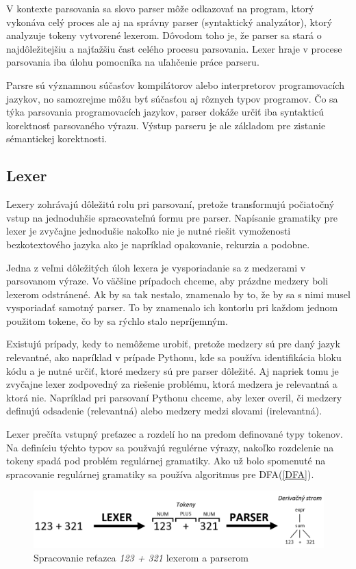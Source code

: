 V kontexte parsovania sa slovo parser môže odkazovať na program, ktorý vykonáva celý proces ale aj na správny parser (syntaktický analyzátor), ktorý analyzuje tokeny vytvorené lexerom. Dôvodom toho je, že parser sa stará o najdôležitejšiu a najťažšiu čast celého procesu parsovania. Lexer hraje v procese parsovania iba úlohu pomocníka na uľahčenie práce parseru.

Parsre sú významnou súčasťov kompilátorov alebo interpretorov programovacích jazykov, no samozrejme môžu byť súčasťou aj rôznych typov programov. Čo sa týka parsovania programovacích jazykov, parser dokáže určiť iba syntakticú korektnosť parsovaného výrazu. Výstup parseru je ale základom pre zistanie sémantickej korektnosti.

\subsection{Lexer}\label{lexer}
Lexery zohrávajú dôležitú  rolu pri parsovaní, pretože transformujú počiatočný vstup na jednoduhšie spracovateľnú formu pre parser. Napísanie gramatiky pre lexer je zvyčajne jednodušie nakoľko nie je nutné riešit vymoženosti bezkotextového jazyka ako je napríklad opakovanie, rekurzia a podobne.

Jedna z veľmi dôležitých úloh lexera je vysporiadanie sa z medzerami v parsovanom výraze. Vo väčšine prípadoch chceme, aby prázdne medzery boli lexerom odstránené. Ak by sa tak nestalo, znamenalo by to, že by sa s nimi musel vysporiadať samotný parser. To by znamenalo ich kontorlu pri každom jednom použitom tokene, čo by sa rýchlo stalo nepríjemným.

Existujú prípady, kedy to nemôžeme urobiť, pretože medzery sú pre daný jazyk relevantné, ako napríklad v prípade Pythonu, kde sa používa identifikácia bloku kódu a je nutné určiť, ktoré medzery sú pre parser dôležité. Aj napriek tomu je zvyčajne lexer zodpovedný za riešenie problému, ktorá medzera je relevantná a ktorá nie. Napríklad pri parsovaní Pythonu chceme, aby lexer overil, či medzery definujú odsadenie (relevantná) alebo medzery medzi slovami (irelevantná). \cite{tomassetti:parsing}

Lexer prečíta vstupný preťazec a rozdelí ho na predom definované typy tokenov. Na definíciu týchto typov sa použvajú regulérne výrazy, nakoľko rozdelenie na tokeny spadá pod problém regulárnej gramatiky. Ako už bolo spomenuté na spracovanie regulárnej gramatiky sa používa algoritmus pre DFA(\ref{DFA}).

\begin{figure}[H]
\begin{center}
\includegraphics[width=14cm]{figures/lexer_parser.PNG}
\caption{Spracovanie reťazca \textit{123 + 321} lexerom a parserom}
\label{fig:lexer_parser}
\end{center}
\end{figure}

